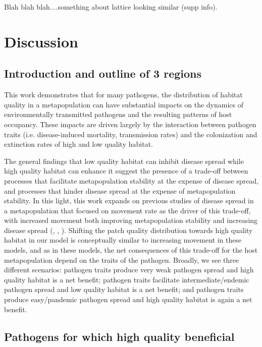 \documentclass{article}
\begin{document}
Blah blah blah....something about lattice looking similar (supp info).



\section{Discussion}
\label{discussion} 

\subsection*{Introduction and outline of 3 regions}

This work demonstrates that for many pathogens, the distribution of habitat quality in a metapopulation can have substantial impacts on the dynamics of environmentally transmitted pathogens and the resulting patterns of host occupancy.  
These impacts are driven largely by the interaction between pathogen traits (i.e. disease-induced mortality, transmission rates) and the colonization and extinction rates of high and low quality habitat.
 
The general findings that low quality habitat can inhibit disease spread while high quality habitat can enhance it suggest the presence of a trade-off between processes that facilitate metapopulation stability at the expense of disease spread, and processes that hinder disease spread at the expense of metapopulation stability.
In this light, this work expands on previous studies of disease spread in a metapopulation that focused on movement rate as the driver of this trade-off, with increased movement both improving metapopulation stability and increasing disease spread (\cite{Hess1996}, \cite{Gog2002}, \cite{Park2012}).  
Shifting the patch quality distribution towards high quality habitat in our model is  conceptually similar to increasing movement in these models, and as in these models, the net consequences of this trade-off for the host metapopulation depend on the traits of the pathogen.
Broadly, we see three different scenarios: pathogen traits produce very weak pathogen spread and high quality habitat is a net benefit; pathogen traits facilitate intermediate/endemic pathogen spread and low quality habitat is a net benefit; and pathogen traits produce easy/pandemic pathogen spread and high quality habitat is again a net benefit.  

\subsection*{Pathogens for which high quality beneficial}
\end{document}
